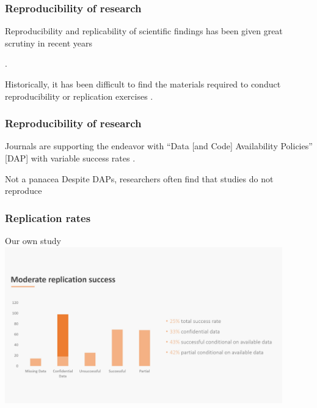 
\begin{frame}
  \frametitle{Reproducibility of research}

\begin{block}{Reproducibility and replicability of scientific findings has been given great scrutiny in recent years}

 .
\end{block}
\pause
\begin{block}{Historically, it has been difficult to find the materials required to conduct reproducibility or replication exercises}
	.  
\end{block}
\end{frame}


\begin{frame}
\frametitle{Reproducibility of research}
\begin{block}{Journals are supporting the endeavor with ``Data [and Code] Availability Policies'' [DAP]}
	with variable success rates
	. 
\end{block}	

\pause
\begin{block}{Not a panacea}
	Despite DAPs, researchers often find that studies do not reproduce 
	
\end{block}

\end{frame}


\begin{frame}
\frametitle{Replication rates}
\begin{block}{Our own study}
\includegraphics[width=0.9\textwidth]{images/bitss_slides_121018_Slide41.jpg}
\end{block}
\end{frame}


